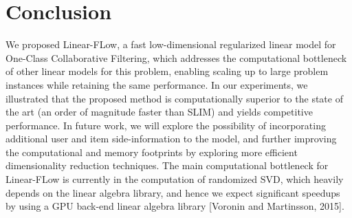 \documentclass{article}
\begin{document}
\begin{table*}[!htb]
\end{table*}
% 

\section{Conclusion}

We proposed Linear-FLow, a fast low-dimensional regularized linear model for One-Class Collaborative Filtering, which addresses the computational bottleneck of other linear models for this problem, enabling scaling up to large problem instances while retaining the same performance. In our experiments, we illustrated that the proposed method is computationally superior to the state of the art (an order of magnitude faster than SLIM) and yields competitive performance. In future work, we will explore the possibility of incorporating additional user and item side-information to the model, and further improving the computational and memory footprints by exploring more efficient dimensionality reduction techniques. The main computational bottleneck for Linear-FLow is currently in the computation of randomized SVD, which heavily depends on the linear algebra library, and hence we expect significant speedups by using a GPU back-end linear algebra library [Voronin and Martinsson, 2015]. 


\newpage



\end{document}
